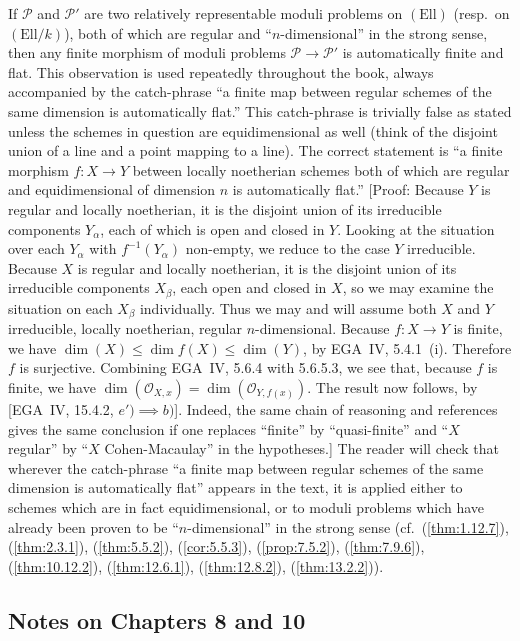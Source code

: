 If $\mathcal{P}$ and $\mathcal{P}'$ are two relatively representable moduli problems on $(\mathrm{Ell})$ (resp.~on $(\mathrm{Ell}/k)$), both of which are regular and ``$n$-dimensional'' in the strong sense, then any finite morphism of moduli problems $\mathcal{P} \to \mathcal{P}'$ is automatically finite and flat. This observation is used repeatedly throughout the book, always accompanied by the catch-phrase ``a finite map between regular schemes of the same dimension is automatically flat.'' This catch-phrase is trivially false as stated unless the schemes in question are equidimensional as well (think of the disjoint union of a line and a point mapping to a line). The correct statement is ``a finite morphism $f: X \to Y$ between locally noetherian schemes both of which are regular and equidimensional of dimension $n$ is automatically flat.'' [Proof: Because $Y$ is regular and locally noetherian, it is the disjoint union of its irreducible components $Y_\alpha$, each of which is open and closed in $Y$. Looking at the situation over each $Y_\alpha$ with $f^{-1}(Y_\alpha)$ non-empty, we reduce to the case $Y$ irreducible. Because $X$ is regular and locally noetherian, it is the disjoint union of its irreducible components $X_\beta$, each open and closed in $X$, so we may examine the situation on each $X_\beta$ individually. Thus we may and will assume both $X$ and $Y$ irreducible, locally noetherian, regular $n$-dimensional. Because $f: X \to Y$ is finite, we have $\dim(X) \le \dim f(X) \le \dim(Y)$, by EGA~IV, 5.4.1~(i). Therefore $f$ is surjective. Combining EGA~IV, 5.6.4 with 5.6.5.3, we see that, because $f$ is finite, we have $\dim(\mathcal{O}_{X,x}) = \dim(\mathcal{O}_{Y,f(x)})$. The result now follows, by [EGA~IV, 15.4.2, $e') \implies b)$]. Indeed, the same chain of reasoning and references gives the same conclusion if one replaces ``finite'' by ``quasi-finite'' and ``$X$ regular'' by ``$X$ Cohen-Macaulay'' in the hypotheses.] The reader will check that wherever the catch-phrase ``a finite map between regular schemes of the same dimension is automatically flat'' appears in the text, it is applied either to schemes which are in fact equidimensional, or to moduli problems which have already been proven to be ``$n$-dimensional'' in the strong sense (cf.~(\ref{thm:1.12.7}), (\ref{thm:2.3.1}), (\ref{thm:5.5.2}), (\ref{cor:5.5.3}), (\ref{prop:7.5.2}), (\ref{thm:7.9.6}), (\ref{thm:10.12.2}), (\ref{thm:12.6.1}), (\ref{thm:12.8.2}), (\ref{thm:13.2.2})).

\subsection*{Notes on Chapters 8 and 10}

